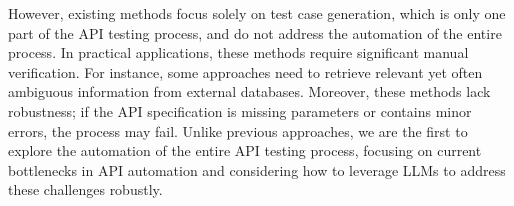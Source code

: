 However, existing methods focus solely on test case generation, which is only one part of the API testing process, and do not address the automation of the entire process. In practical applications, these methods require significant manual verification. For instance, some approaches need to retrieve relevant yet often ambiguous information from external databases. Moreover, these methods lack robustness; if the API specification is missing parameters or contains minor errors, the process may fail. Unlike previous approaches, we are the first to explore the automation of the entire API testing process, focusing on current bottlenecks in API automation and considering how to leverage LLMs to address these challenges robustly.